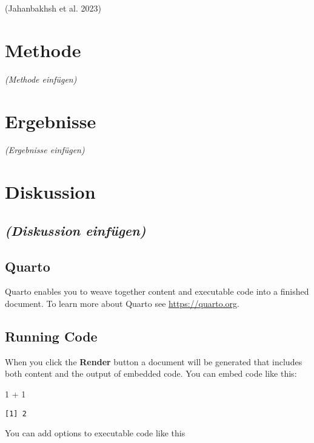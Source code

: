 \documentclass[
  12pt,
  a4paper,
]{article}
\newenvironment{Shaded}{\begin{snugshade}}{\end{snugshade}}
\newcommand{\DecValTok}[1]{\textcolor[rgb]{0.68,0.00,0.00}{#1}}
\newcommand{\SpecialCharTok}[1]{\textcolor[rgb]{0.37,0.37,0.37}{#1}}
\begin{document}
(Jahanbakhsh et al. 2023)

\section{Methode}\label{methode}

\emph{(Methode einfügen)}

\section{Ergebnisse}\label{ergebnisse}

\emph{(Ergebnisse einfügen)}

\section{Diskussion}\label{diskussion}

\subsection{\texorpdfstring{\emph{(Diskussion
einfügen)}}{(Diskussion einfügen)}}\label{diskussion-einfuxfcgen}

\subsection{Quarto}\label{quarto}

Quarto enables you to weave together content and executable code into a
finished document. To learn more about Quarto see
\url{https://quarto.org}.

\subsection{Running Code}\label{running-code}

When you click the \textbf{Render} button a document will be generated
that includes both content and the output of embedded code. You can
embed code like this:

\begin{Shaded}
\begin{Highlighting}[]
\DecValTok{1} \SpecialCharTok{+} \DecValTok{1}
\end{Highlighting}
\end{Shaded}

\begin{verbatim}
[1] 2
\end{verbatim}

You can add options to executable code like this
\end{document}
